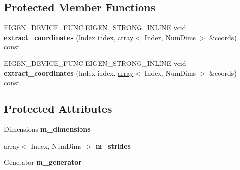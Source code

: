 \subsection*{Protected Member Functions}
\begin{DoxyCompactItemize}
\item 
\mbox{\label{struct_eigen_1_1_tensor_evaluator_3_01const_01_tensor_generator_op_3_01_generator_00_01_arg_type_01_4_00_01_device_01_4_a707e532ae9208c2035f79e484deccde5}} 
E\+I\+G\+E\+N\+\_\+\+D\+E\+V\+I\+C\+E\+\_\+\+F\+U\+NC E\+I\+G\+E\+N\+\_\+\+S\+T\+R\+O\+N\+G\+\_\+\+I\+N\+L\+I\+NE void {\bfseries extract\+\_\+coordinates} (Index index, \hyperlink{class_eigen_1_1array}{array}$<$ Index, Num\+Dims $>$ \&coords) const
\item 
\mbox{\label{struct_eigen_1_1_tensor_evaluator_3_01const_01_tensor_generator_op_3_01_generator_00_01_arg_type_01_4_00_01_device_01_4_a707e532ae9208c2035f79e484deccde5}} 
E\+I\+G\+E\+N\+\_\+\+D\+E\+V\+I\+C\+E\+\_\+\+F\+U\+NC E\+I\+G\+E\+N\+\_\+\+S\+T\+R\+O\+N\+G\+\_\+\+I\+N\+L\+I\+NE void {\bfseries extract\+\_\+coordinates} (Index index, \hyperlink{class_eigen_1_1array}{array}$<$ Index, Num\+Dims $>$ \&coords) const
\end{DoxyCompactItemize}
\subsection*{Protected Attributes}
\begin{DoxyCompactItemize}
\item 
\mbox{\label{struct_eigen_1_1_tensor_evaluator_3_01const_01_tensor_generator_op_3_01_generator_00_01_arg_type_01_4_00_01_device_01_4_a3b65416ebff8d46cdb9c33d023235ed8}} 
Dimensions {\bfseries m\+\_\+dimensions}
\item 
\mbox{\label{struct_eigen_1_1_tensor_evaluator_3_01const_01_tensor_generator_op_3_01_generator_00_01_arg_type_01_4_00_01_device_01_4_a2986d1f40ffda581f7c93196c0aa7ad0}} 
\hyperlink{class_eigen_1_1array}{array}$<$ Index, Num\+Dims $>$ {\bfseries m\+\_\+strides}
\item 
\mbox{\label{struct_eigen_1_1_tensor_evaluator_3_01const_01_tensor_generator_op_3_01_generator_00_01_arg_type_01_4_00_01_device_01_4_a83c4c7436e6391035d33398240910c87}} 
Generator {\bfseries m\+\_\+generator}
\end{DoxyCompactItemize}


